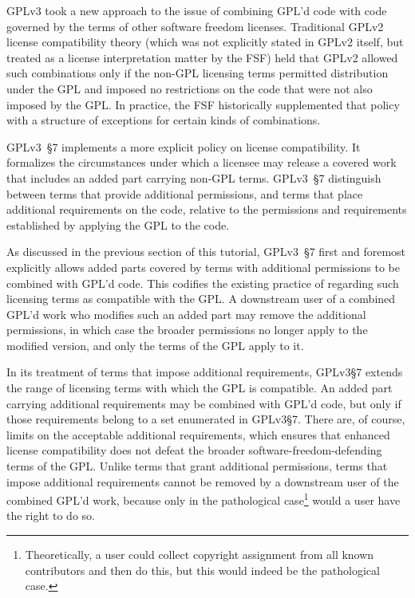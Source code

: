 GPLv3  took a new approach to the issue of combining GPL'd code with
code governed by the terms of other software freedom licenses.  Traditional
GPLv2 license compatibility theory (which was not explicitly stated in GPLv2
itself, but treated as a license interpretation matter by the FSF) held that GPLv2 allowed such
combinations only if the non-GPL licensing terms permitted distribution under
the GPL and imposed no restrictions on the code that were not also imposed by
the GPL\@.  In practice, the FSF historically supplemented that policy with a structure of
exceptions for certain kinds of combinations.

GPLv3~\S7  implements a more explicit policy on license
compatibility.  It formalizes the circumstances under which a licensee may
release a covered work that includes an added part carrying non-GPL terms. 
GPLv3~\S7 distinguish between terms that provide additional permissions, and terms that
place additional requirements on the code, relative to the permissions and
requirements established by applying the GPL to the code.

As discussed in the previous section of this tutorial, GPLv3~\S7 first and foremost explicitly allows added parts covered by terms with
additional permissions to be combined with GPL'd code. This codifies the
existing practice of regarding such licensing terms as compatible with the
GPL\@. A downstream user of a combined GPL'd work who modifies such an added
part may remove the additional permissions, in which case the broader
permissions no longer apply to the modified version, and only the terms of
the GPL apply to it.

In its treatment of terms that impose additional requirements, GPLv3\S7
extends the range of licensing terms with which the GPL is compatible.  An
added part carrying additional requirements may be combined with GPL'd code,
but only if those requirements belong to a set enumerated in GPLv3\S7. There
are, of course, limits on the acceptable additional requirements, which 
ensures that enhanced license compatibility does not
defeat the broader software-freedom-defending terms of the GPL\@. Unlike terms that grant
additional permissions, terms that impose additional requirements cannot be
removed by a downstream user of the combined GPL'd work, because only in the
pathological case\footnote{Theoretically, a user could collect copyright
  assignment from all known contributors and then do this, but this would
  indeed be the pathological case.}  would a user have the right to do so.

